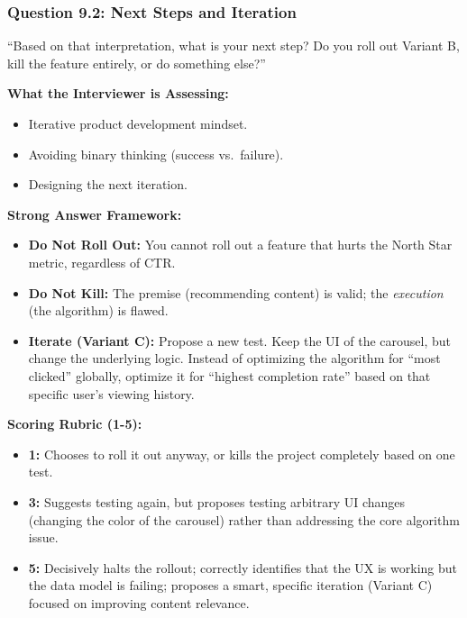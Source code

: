 \subsubsection{Question 9.2: Next Steps and
Iteration}\label{question-9.2-next-steps-and-iteration}

``Based on that interpretation, what is your next step? Do you roll out
Variant B, kill the feature entirely, or do something else?''

\textbf{What the Interviewer is Assessing:}

\begin{itemize}
\tightlist
\item
  Iterative product development mindset.
\item
  Avoiding binary thinking (success vs.~failure).
\item
  Designing the next iteration.
\end{itemize}

\textbf{Strong Answer Framework:}

\begin{itemize}
\tightlist
\item
  \textbf{Do Not Roll Out:} You cannot roll out a feature that hurts the
  North Star metric, regardless of CTR.
\item
  \textbf{Do Not Kill:} The premise (recommending content) is valid; the
  \emph{execution} (the algorithm) is flawed.
\item
  \textbf{Iterate (Variant C):} Propose a new test. Keep the UI of the
  carousel, but change the underlying logic. Instead of optimizing the
  algorithm for ``most clicked'' globally, optimize it for ``highest
  completion rate'' based on that specific user's viewing history.
\end{itemize}

\textbf{Scoring Rubric (1-5):}

\begin{itemize}
\tightlist
\item
  \textbf{1:} Chooses to roll it out anyway, or kills the project
  completely based on one test.
\item
  \textbf{3:} Suggests testing again, but proposes testing arbitrary UI
  changes (changing the color of the carousel) rather than addressing
  the core algorithm issue.
\item
  \textbf{5:} Decisively halts the rollout; correctly identifies that
  the UX is working but the data model is failing; proposes a smart,
  specific iteration (Variant C) focused on improving content relevance.
\end{itemize}

